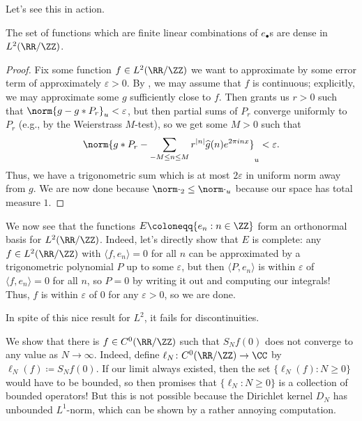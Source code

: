 \documentclass[../notes.tex]{subfiles}
\begin{document}
Let's see this in action.
\begin{proposition} \label{prop:ens-dense-in-l2}
	The set of functions which are finite linear combinations of $e_\bullet$s are dense in $L^2(\RR/\ZZ)$.
\end{proposition}
\begin{proof}
	Fix some function $f\in L^2(\RR/\ZZ)$ we want to approximate by some error term of approximately $\varepsilon>0$. By , we may assume that $f$ is continuous; explicitly, we may approximate some $g$ sufficiently close to $f$. Then  grants us $r>0$ such that $\norm{g-g*P_r}_u<\varepsilon$, but then partial sums of $P_r$ converge uniformly to $P_r$ (e.g., by the Weierstrass $M$-test), so we get some $M>0$ such that
	\[\norm{g*P_r-\sum_{-M\le n\le M}r^{\left|n\right|}\widehat g(n)e^{2\pi inx}}_u<\varepsilon.\]
	Thus, we have a trigonometric sum which is at most $2\varepsilon$ in uniform norm away from $g$. We are now done because $\norm\cdot_2\le\norm\cdot_u$ because our space has total measure $1$.
\end{proof}
\begin{remark}
	We now see that the functions $E\coloneqq\{e_n:n\in\ZZ\}$ form an orthonormal basis for $L^2(\RR/\ZZ)$. Indeed, let's directly show that $E$ is complete: any $f\in L^2(\RR/\ZZ)$ with $\langle f,e_n\rangle=0$ for all $n$ can be approximated by a trigonometric polynomial $P$ up to some $\varepsilon$, but then $\langle P,e_n\rangle$ is within $\varepsilon$ of $\langle f,e_n\rangle=0$ for all $n$, so $P=0$ by writing it out and computing our integrals! Thus, $f$ is within $\varepsilon$ of $0$ for any $\varepsilon>0$, so we are done.
\end{remark}
In spite of this nice result for $L^2$, it fails for discontinuities.
\begin{example} \label{ex:family-of-unbounded}
	We show that there is $f\in C^0(\RR/\ZZ)$ such that $S_Nf(0)$ does not converge to any value as $N\to\infty$. Indeed, define $\ell_N\colon C^0(\RR/\ZZ)\to\CC$ by $\ell_N(f)\coloneqq S_Nf(0)$. If our limit always existed, then the set $\{\ell_N(f):N\ge0\}$ would have to be bounded, so  then promises that $\{\ell_N:N\ge0\}$ is a collection of bounded operators! But this is not possible because the Dirichlet kernel $D_N$ has unbounded $L^1$-norm, which can be shown by a rather annoying computation.
\end{example}
\end{document}
